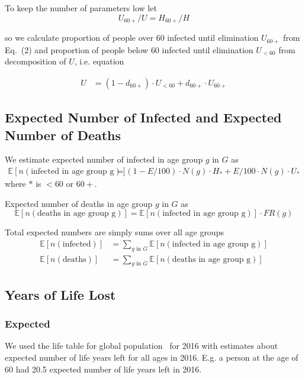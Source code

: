 \documentclass[12pt]{article}
\begin{document}
To keep the number of parameters low let
\begin{equation*}
	U_{60+} / U = H_{60+} / H
	\tag{2}
\end{equation*}

so we calculate proportion of people over 60 infected until elimination $U_{60+}$ from Eq.~(2) and proportion of people below 60 infected until elimination $U_{<60}$ from decomposition of $U$, i.e. equation

\begin{align*}
U &= (1 - d_{60+}) \cdot U_{<60} + d_{60+} \cdot U_{60+}
\end{align*}

\subsection*{Expected Number of Infected and Expected Number of Deaths}
We estimate expected number of infected in age group $g$ in $G$ as
\begin{align*}
  \mathbb{E} \left[ n(\text{infected in age group g}) \right] &=
    (1 - E/100) \cdot N(g) \cdot H_{\text{*}} + E/100 \cdot N(g) \cdot U_{\text{*}}
\end{align*}
where $\text{*}$ is $<60$ or $60+$.

Expected number of deaths in age group $g$ in $G$ as
\begin{equation*}
  \mathbb{E} \left[ n(\text{deaths in age group g}) \right]  =
  \mathbb{E} \left[ n(\text{infected in age group g}) \right]  \cdot FR(g)
\end{equation*}

Total expected numbers are simply sums over all age groups
\begin{align*}
  \mathbb{E} \left[ n(\text{infected}) \right] &= \sum_{g \text{ in } G} 
  \mathbb{E} \left[  n(\text{infected in age group g}) \right]  \\
  \mathbb{E} \left[  n(\text{deaths}) \right] &= \sum_{g \text{ in } G} 
  \mathbb{E} \left[  n(\text{deaths in age group g}) \right]
\end{align*}


\subsection*{Years of Life Lost}

\subsubsection*{Expected}
We used the life table for global population~\cite{expectancies} for 2016 with estimates about expected number of life years left for all ages in 2016. E.g. a person at the age of 60 had 20.5 expected number of life years left in 2016.
\end{document}
